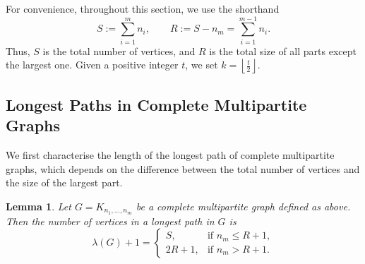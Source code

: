 \documentclass[12pt,reqno]{amsart}
\newtheorem{lemma}[lemma]{Lemma}
\theoremstyle{definition}
\begin{document}
For convenience, throughout this section, we use the shorthand
\[
S:=\sum_{i=1}^m n_i,
\qquad
R:=S-n_m=\sum_{i=1}^{m-1} n_i.
\]
Thus, $S$ is the total number of vertices, and $R$ is the total size of all parts except the largest one. Given a positive integer $t$, we set $k = \left\lfloor \frac{t}{2} \right\rfloor$. 

\subsection{Longest Paths in Complete Multipartite Graphs}

We first characterise the length of the longest path of complete multipartite graphs, which depends on the difference between the total number of vertices and the size of the largest part.

\begin{lemma}\label{lem: number of vertices in a longest path}
Let $G = K_{n_1,\dots,n_m}$ be a complete multipartite graph defined as above. 
Then the number of vertices in a longest path in $G$ is
\begin{equation}\label{max-path-length in CMG}
\lambda(G) + 1 =
\begin{cases}
S, & \text{if } n_m \le R + 1,\\
2R + 1, & \text{if } n_m > R + 1.
\end{cases}
\end{equation}
\end{lemma}
\end{document}
